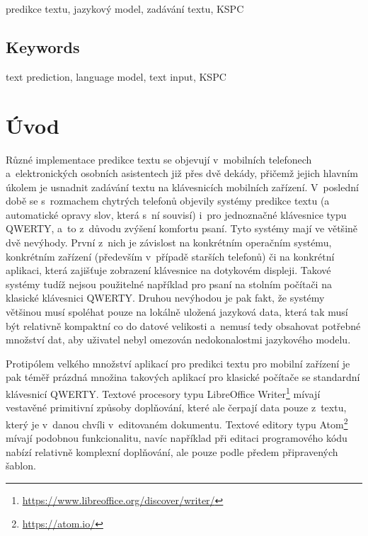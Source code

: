 \documentclass[a4paper,11pt,openany]{book} %
\begin{document}
predikce textu, jazykový model, zadávání textu, KSPC

\section*{Keywords}

text prediction, language model, text input, KSPC

\clearpage

\tableofcontents

\clearpage


\chapter*{Úvod}

Různé implementace predikce textu se objevují v~mobilních telefonech a~elektronických osobních asistentech již přes dvě dekády, přičemž jejich hlavním úkolem je usnadnit zadávání textu na klávesnicích mobilních zařízení. V~poslední době se s~rozmachem chytrých telefonů objevily systémy predikce textu (a automatické opravy slov, která s~ní souvisí) i~pro jednoznačné klávesnice typu QWERTY, a~to z~důvodu zvýšení komfortu psaní. Tyto systémy mají ve většině dvě nevýhody. První z~nich je závislost na konkrétním operačním systému, konkrétním zařízení (především v~případě starších telefonů) či na konkrétní aplikaci, která zajišťuje zobrazení klávesnice na dotykovém displeji. Takové systémy tudíž nejsou použitelné například pro psaní na stolním počítači na klasické klávesnici QWERTY. Druhou nevýhodou je pak fakt, že systémy většinou musí spoléhat pouze na lokálně uložená jazyková data, která tak musí být relativně kompaktní co do datové velikosti a~nemusí tedy obsahovat potřebné množství dat, aby uživatel nebyl omezován nedokonalostmi jazykového modelu.

Protipólem velkého množství aplikací pro predikci textu pro mobilní zařízení je pak téměř prázdná množina takových aplikací pro klasické počítače se standardní klávesnicí QWERTY. Textové procesory typu LibreOffice Writer\footnote{\url{https://www.libreoffice.org/discover/writer/}} mívají vestavěné primitivní způsoby doplňování, které ale čerpají data pouze z~textu, který je v~danou chvíli v~editovaném dokumentu. Textové editory typu Atom\footnote{\url{https://atom.io/}} mívají podobnou funkcionalitu, navíc například při editaci programového kódu nabízí relativně komplexní doplňování, ale pouze podle předem připravených šablon.
\end{document}
